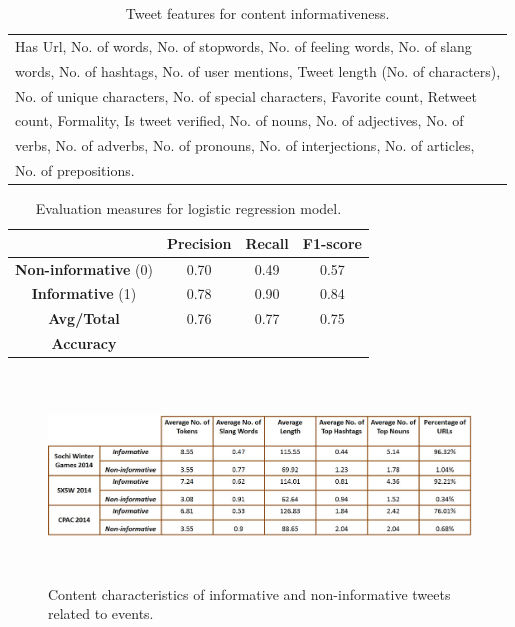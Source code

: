 \begin{savenotes}
\begin{table}[ht]
\centering
\caption{Tweet features for content informativeness.}
\label{tweetfeature}
\begin{tabular}{|l|}
\hline
Has Url, No. of words, No. of stopwords, No. of feeling words, No. of slang \\ 
words, No. of hashtags, No. of user mentions, Tweet  length (No. of characters),\\  No. of unique 
characters, No. of special characters, Favorite count, Retweet \\ count, Formality, Is tweet verified, No. of nouns, No. of adjectives, No. of \\ verbs, No. of adverbs, No. of pronouns, No. of interjections, No. of articles, \\ No. of prepositions.
 \\ \hline
\end{tabular}
\end{table}
\end{savenotes}

\begin{table}[ht]
\centering
\caption{Evaluation measures for logistic regression model.}
\label{logregreseval}
\begin{tabular}{c|c|c|c|}
\cline{2-4}
\multicolumn{1}{l|}{}                          & \textbf{Precision} & \textbf{Recall}       & \textbf{F1-score}     \\ \hline
\multicolumn{1}{|c|}{\textbf{Non-informative} (0)} & 0.70               & 0.49                  & 0.57                  \\ \hline
\multicolumn{1}{|c|}{\textbf{Informative} (1)}     & 0.78               & 0.90                  & 0.84                  \\ \hline
\multicolumn{1}{|c|}{\textbf{Avg/Total}}       & 0.76               & 0.77                  & 0.75                  \\ \hline
\multicolumn{1}{|c}{\textbf{Accuracy}} =  & \multicolumn{1}{l}{} 76.64\%            & \multicolumn{1}{l}{} & \multicolumn{1}{l|}{} \\ \hline
\end{tabular}
\end{table}

\begin{figure}[htbp]
\centering
\caption{Content characteristics of informative and non-informative tweets related to events.}
    \includegraphics[width=15cm,height=5.5cm]{Figures/InformationAnalysisTable.jpg}
    
    \label{infoanalysis}
\end{figure}



